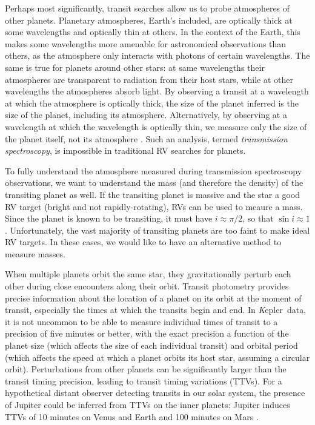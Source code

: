 \documentclass[12pt]{caltech_thesis}
\newcommand{\kep}{{\textit Kepler}}
\begin{document}
Perhaps most significantly, transit searches allow us to probe atmospheres of
other planets.
Planetary atmospheres, Earth's included, are optically thick at some wavelengths and
optically thin at others. 
In the context of the Earth, this makes some wavelengths more amenable for astronomical
observations than others, as the atmosphere only interacts with photons of certain
wavelengths.
The same is true for planets around other stars: at same wavelengths their atmospheres
are transparent to radiation from their host stars, while at other wavelengths
the atmospheres absorb light.
By observing a transit at a wavelength at which the atmosphere is optically thick, the
size of the planet inferred is the size of the planet, including its atmosphere.
Alternatively, by observing at a wavelength at which the wavelength is optically thin,
we measure only the size of the planet itself, not its atmosphere \citep[e.g.][]{Knutson11, Knutson14}. 
Such an analysis, termed \textit{transmission spectroscopy}, is impossible in traditional RV searches for planets.

To fully understand the atmosphere measured during transmission spectroscopy observations,
we want to understand the mass (and therefore the density) of the transiting planet as
well.
If the transiting planet is massive and the star a good RV target (bright and not 
rapidly-rotating), RVs can be used to meaure a mass. 
Since the planet is known to be transiting, it must have $i \approx \pi/2$, so that
$\sin i \approx 1$. 
Unfortunately, the vast majority of transiting planets are too faint to make ideal
RV targets.
In these cases, we would like to have an alternative method to measure masses.

When multiple planets orbit the same star, they gravitationally perturb each other
during close encounters along their orbit.
Transit photometry provides precise information about the location of a planet on its 
orbit at the moment of transit, especially the times at which the transits
begin and end.
In \kep\ data, it is not uncommon to be able to measure individual times of transit to a
precision of five minutes or better, with the exact precision a function of the 
planet size (which affects the size of each individual transit) and orbital period
(which affects the speed at which a planet orbits its host star, assuming a 
circular orbit).
Perturbations from other planets can be significantly larger than the transit timing
precision, leading to transit timing variations (TTVs). 
For a hypothetical distant observer detecting transits in our solar system, the
presence of Jupiter could be inferred from TTVs on the inner planets: 
Jupiter induces TTVs of 10 minutes on Venus and Earth and 100 minutes on Mars
\citep{Agol05, Holman05}.
\end{document}
